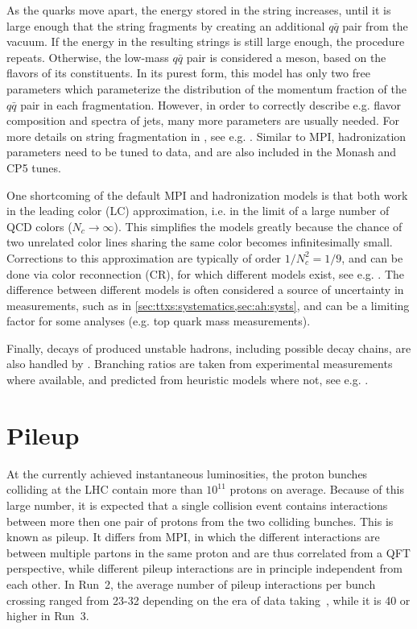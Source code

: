 As the quarks move apart, the energy stored in the string increases, until it is large enough that the string fragments by creating an additional $q\bar{q}$ pair from the vacuum. If the energy in the resulting strings is still large enough, the procedure repeats. Otherwise, the low-mass $q\bar{q}$ pair is considered a meson, based on the flavors of its constituents. In its purest form, this model has only two free parameters which parameterize the distribution of the momentum fraction of the $q\bar{q}$ pair in each fragmentation. However, in order to correctly describe e.g. flavor composition and \pt spectra of jets, many more parameters are usually needed. For more details on string fragmentation in \pythia, see e.g. . Similar to MPI, hadronization parameters need to be tuned to data, and are also included in the Monash and CP5 tunes.

One shortcoming of the default MPI and hadronization models is that both work in the leading color (LC) approximation, i.e. in the limit of a large number of QCD colors ($N_c \rightarrow \infty$). This simplifies the models greatly because the chance of two unrelated color lines sharing the same color becomes infinitesimally small. Corrections to this approximation are typically of order $1/N_c^2 = 1/9$, and can be done via color reconnection (CR), for which different models exist, see e.g. . The difference between different models is often considered a source of uncertainty in measurements, such as in \cref{sec:ttxs:systematics,sec:ah:systs}, and can be a limiting factor for some analyses (e.g. top quark mass measurements).

Finally, decays of produced unstable hadrons, including possible decay chains, are also handled by \pythia. Branching ratios are taken from experimental measurements where available, and predicted from heuristic models where not, see e.g. .

\section{Pileup}
\label{sec:mc:pileup}

At the currently achieved instantaneous luminosities, the proton bunches colliding at the LHC contain more than $10^{11}$ protons on average. Because of this large number, it is expected that a single collision event contains interactions between more then one pair of protons from the two colliding bunches. This is known as pileup. It differs from MPI, in which the different interactions are between multiple partons in the same proton and are thus correlated from a QFT perspective, while different pileup interactions are in principle independent from each other. In Run~2, the average number of pileup interactions per bunch crossing ranged from 23-32 depending on the era of data taking~\cite{CMS:2020ebo}, while it is 40 or higher in Run~3.

